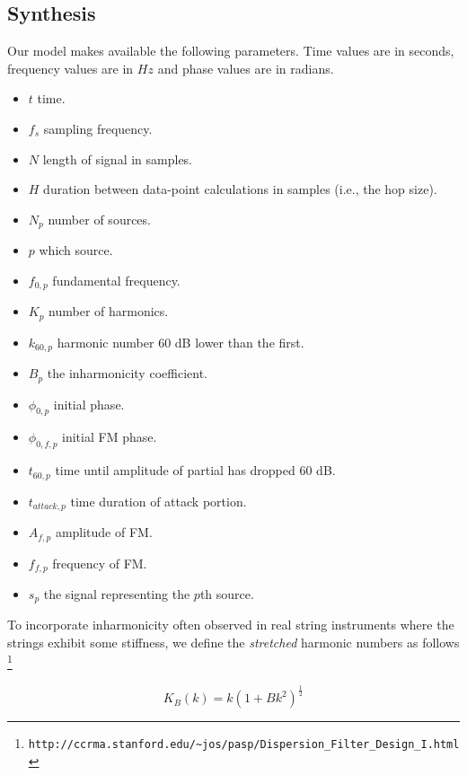 \documentclass[letterpaper,12pt]{report}
\begin{document}
\subsection{Synthesis}
Our model makes available the following parameters. Time values are in seconds,
frequency values are in $Hz$ and phase values are in radians.
\begin{itemize}
    \item
        $t$ time.
    \item
        $f_{s}$ sampling frequency.
    \item
        $N$ length of signal in samples.
    \item
        $H$ duration between data-point calculations in samples (i.e., the hop
        size).
    \item
        $N_{p}$ number of sources.
    \item
        $p$ which source.
    \item
        $f_{0,p}$ fundamental frequency.
    \item
        $K_{p}$ number of harmonics.
    \item
        $k_{60,p}$ harmonic number 60 dB lower than the first.
    \item 
        $B_{p}$ the inharmonicity coefficient.
    \item
        $\phi_{0,p}$ initial phase.
    \item
        $\phi_{0,f,p}$ initial FM phase.
    \item
        $t_{60,p}$ time until amplitude of partial has dropped 60 dB.
    \item
        $t_{attack,p}$ time duration of attack portion.
    \item
        $A_{f,p}$ amplitude of FM.
    \item
        $f_{f,p}$ frequency of FM.
    \item
        $s_{p}$ the signal representing the $p$th source.
\end{itemize}

To incorporate inharmonicity often observed in real string instruments where the
strings exhibit some stiffness, we define the \textit{stretched} harmonic numbers
as follows
\cite{paspweb2010}\footnote{
\texttt{http://ccrma.stanford.edu/\~{}jos/pasp/Dispersion\_Filter\_Design\_I.html}}

\begin{equation}
    K_{B}(k) = k (1+Bk^{2})^{\frac{1}{2}}
\end{equation}
\end{document}
